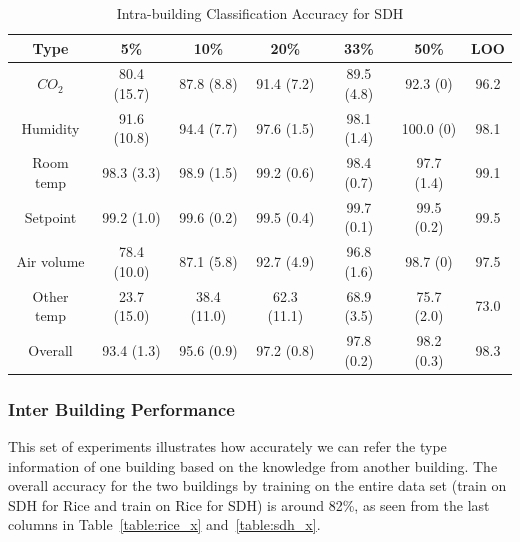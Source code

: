 \begin{table}[ht!]
\centering %
\begin{tabular}{c | c | c | c | c | c | c}%
\hline %
Type & 5\% & 10\% & 20\% & 33\% & 50\% & LOO\\ %
\hline\hline %
$CO_{2}$ & 80.4 (15.7) & 87.8 (8.8) & 91.4 (7.2) & 89.5 (4.8) & 92.3 (0) & 96.2\\ \hline
Humidity & 91.6 (10.8) & 94.4 (7.7) & 97.6 (1.5) & 98.1 (1.4) & 100.0 (0) & 98.1\\ \hline
Room temp & 98.3 (3.3) & 98.9 (1.5) & 99.2 (0.6) & 98.4 (0.7) & 97.7 (1.4) & 99.1\\ \hline
Setpoint & 99.2 (1.0) & 99.6 (0.2) & 99.5 (0.4) & 99.7 (0.1) & 99.5 (0.2) & 99.5\\ \hline
Air volume & 78.4 (10.0) & 87.1 (5.8) & 92.7 (4.9) & 96.8 (1.6) & 98.7 (0) & 97.5\\ \hline
Other temp & 23.7 (15.0) & 38.4 (11.0) & 62.3 (11.1) & 68.9 (3.5) & 75.7 (2.0) & 73.0\\ \hline
Overall & 93.4 (1.3) & 95.6 (0.9) & 97.2 (0.8) & 97.8 (0.2) & 98.2 (0.3) & 98.3\\ \hline
\end{tabular}
\caption{Intra-building Classification Accuracy for SDH}
\label{table:sdh} %
\end{table}

\subsubsection{Inter Building Performance}
This set of experiments illustrates how accurately we can refer the type information of one building based on the knowledge from another building. The overall accuracy for the two buildings by training on the entire data set (train on SDH for Rice and train on Rice for SDH) is around 82\%, as seen from the last columns in Table~\ref{table:rice_x} and~\ref{table:sdh_x}.

